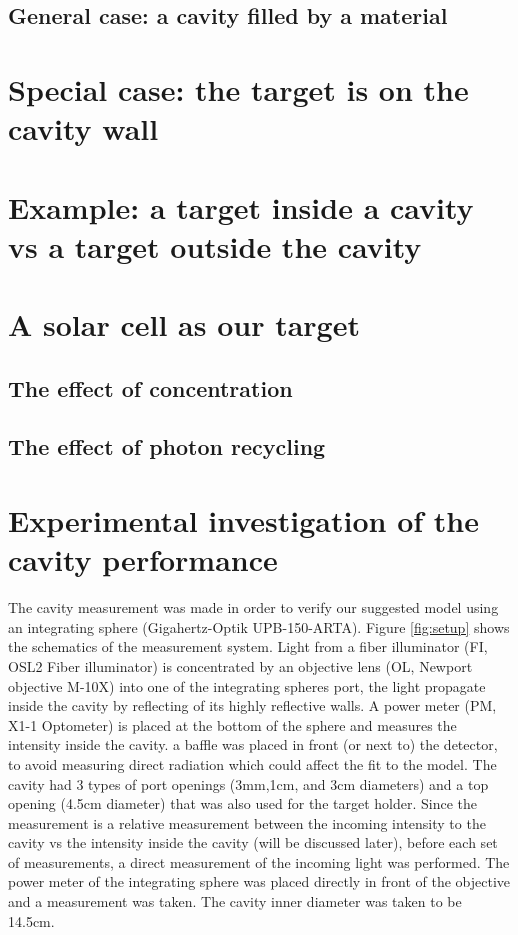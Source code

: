 \documentclass[a4paper]{article}
\begin{document}
\subsection{General case: a cavity filled by a material}
\section{Special case: the target is on the cavity wall}\label{sec3}
\section{Example: a target inside a cavity vs a target outside the cavity}
\section{A solar cell as our target}
\subsection{The effect of concentration}
\subsection{The effect of photon recycling}
\section{Experimental investigation of the cavity performance}
The cavity measurement was made in order to verify our suggested model using an integrating sphere (Gigahertz-Optik UPB-150-ARTA). Figure \ref{fig:setup} shows the schematics of the measurement system. Light from a fiber illuminator (FI, OSL2 Fiber illuminator)  is concentrated by an objective lens (OL, Newport objective M-10X) into one of the integrating spheres port, the light propagate inside the cavity by reflecting of its highly reflective walls. A power meter (PM, X1-1 Optometer) is placed at the bottom of the sphere and measures the intensity inside the cavity. a baffle was placed in front (or next to) the detector, to avoid measuring direct radiation which could affect the fit to the model. The cavity had 3 types of port openings (3mm,1cm, and 3cm diameters) and a top opening (4.5cm diameter) that was also used for the target holder. Since the measurement is a relative measurement between the incoming intensity to the cavity vs the intensity inside the cavity (will be discussed later), before each set of measurements, a direct measurement of the incoming light was performed. The power meter of the integrating sphere was placed directly in front of the objective and a measurement was taken. The cavity inner diameter was taken to be 14.5cm.
\end{document}

